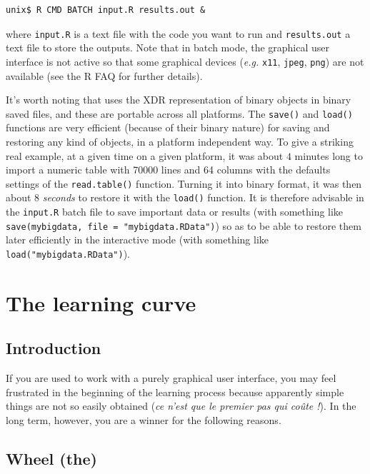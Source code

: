\documentclass{article}
\begin{document}
\begin{verbatim}
unix$ R CMD BATCH input.R results.out &
\end{verbatim}

where \texttt{input.R} is a text file with the \Rlogo{} code you want to run and
\texttt{results.out} a text file to store the outputs. Note that in batch mode,
the graphical user interface is not active so that some graphical devices 
(\textit{e.g.} \texttt{x11}, \texttt{jpeg}, \texttt{png}) are not
available (see the R FAQ \cite{RFAQ} for further details).

It's worth noting that \Rlogo{} uses the XDR representation of binary objects in binary saved files, 
and these are portable across all \Rlogo{} platforms. The \texttt{save()} and \texttt{load()}
functions are very efficient (because of their binary nature) for saving and restoring any 
kind of \Rlogo{} objects, in a platform independent way. To give a striking real example, at a given time
on a given platform, it was about $4$ minutes long to import a numeric table with 70000 lines and 64 columns
with the defaults settings of the \texttt{read.table()} function. Turning it into binary format,
it was then about $8$ \emph{seconds} to restore it with the \texttt{load()} function.
It is therefore advisable in the \texttt{input.R} batch file to save important data or
results (with something like \texttt{save(mybigdata, file = "mybigdata.RData")})
so as to be able to restore them later efficiently in the interactive mode (with something
like \texttt{load("mybigdata.RData")}).


\section{The learning curve}

\subsection*{Introduction}

If you are used to work with a purely graphical user interface, you may feel frustrated in the
beginning of the learning process because apparently simple things are not so easily
obtained (\textit{ce n'est que le premier pas qui co{\^{u}te} !}).
In the long term, however, you are a winner for the following reasons.

\subsection{Wheel (the)}
\end{document}
